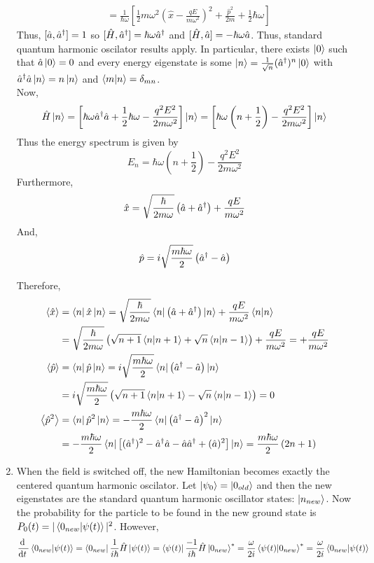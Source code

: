 \documentclass[12pt]{extarticle}
\begin{document}
\begin{enumerate}
\begin{align*}
& =  \frac{1}{\hbar \omega} \left[ \frac{1}{2} m \omega^2 \left(\hat{x} - \frac{qE}{m \omega^2} \right)^2 + \frac{\hat{p}^2}{2 m} + \frac{1}{2} \hbar \omega \right]
\end{align*}
Thus, $[\hat{a}, \hat{a}^\dagger] = 1$ so $[\hat{H}, \hat{a}^\dagger] = \hbar \omega \hat{a}^\dagger$ and $[\hat{H}, \hat{a}] = - \hbar \omega \hat{a}$. Thus, standard quantum harmonic oscilator results apply. In particular, there exists $\left| 0 \right>$ such that $\hat{a} \left| 0 \right> = 0$ and every energy eigenstate is some $\left| n \right> = \frac{1}{\sqrt{n}} (\hat{a}^\dagger)^n \left| 0 \right>$ with $\hat{a}^\dagger \hat{a} \left| n \right> = n \left| n \right>$ and $\left< m | n \right> = \delta_{mn}$. \\

Now, \[\hat{H} \left| n \right> = \left[ \hbar \omega \hat{a}^\dagger \hat{a} + \frac{1}{2} \hbar \omega - \frac{q^2E^2}{2m \omega^2} \right] \left| n \right> = \left[ \hbar \omega \left(n + \frac{1}{2}\right) - \frac{q^2E^2}{2 m \omega^2}  \right] \left| n \right> \]
Thus the energy spectrum is given by
\[E_n = \hbar \omega \left(n + \frac{1}{2}\right) - \frac{q^2E^2}{2m \omega^2} \]
Furthermore, \[\hat{x} = \sqrt{\frac{\hbar}{2 m \omega}} \left( \hat{a} + \hat{a}^\dagger \right) + \frac{qE}{m \omega^2} \]
And, \[\hat{p} = i \sqrt{\frac{m \hbar \omega}{2}} \left( \hat{a}^\dagger - \hat{a} \right)\]

Therefore, 
\begin{align*}
\left< \hat{x} \right> &= \left< n \right| \hat{x} \left| n \right> = \sqrt{\frac{\hbar}{2 m \omega}} \left< n \right| \left( \hat{a} + \hat{a}^\dagger \right) \left| n \right>  + \frac{qE}{m \omega^2} \left< n | n \right> \\ &= \sqrt{\frac{\hbar}{2 m \omega}} \left( \sqrt{n+1} \left< n | n+1 \right> + \sqrt{n} \left< n | n-1 \right> \right) + \frac{qE}{m \omega^2} = + \frac{qE}{m \omega^2} \\
\left< \hat{p} \right> &= \left< n \right| \hat{p} \left| n \right> = i \sqrt{\frac{m \hbar \omega}{2}} \left< n \right| \left( \hat{a}^\dagger - \hat{a} \right) \left| n \right> \\ &= i \sqrt{\frac{m \hbar \omega}{2}} \left( \sqrt{n+1} \left< n | n+1 \right> - \sqrt{n} \left< n | n-1 \right> \right) = 0 \\
\left< \hat{p}^2 \right> &= \left< n \right| \hat{p}^2 \left| n \right> = - \frac{m \hbar \omega}{2} \left< n \right| \left( \hat{a}^\dagger - \hat{a} \right)^2 \left| n \right> \\ &= - \frac{m \hbar \omega}{2} \left< n \right| \left[ (\hat{a}^\dagger)^2 -\hat{a}^\dagger \hat{a} - \hat{a} \hat{a}^\dagger + (\hat{a})^2 \right] \left| n \right> = \frac{m \hbar \omega}{2} \left(2n + 1 \right)
\end{align*}

\item When the field is switched off, the new Hamiltonian becomes exactly the centered quantum harmonic oscilator. Let $\left| \psi_0 \right> = \left| 0_{old} \right>$ and then the new eigenstates are the standard quantum harmonic oscillator states: $\left| n_{new} \right>$. Now the probability for the particle to be found in the new ground state is $P_0(t) = |\left< 0_{new} | \psi(t) \right>|^2$. However, \[\frac{\mathrm{d} \:}{\mathrm{d}t \:} \left< 0_{new} | \psi(t) \right> = \left< 0_{new} \right| \frac{1}{i \hbar} \hat{H} \left| \psi(t) \right> = \left< \psi(t) \right| \frac{-1}{i \hbar} \hat{H} \left| 0_{new} \right>^* = \frac{\omega}{2i} \left< \psi(t) | 0_{new} \right>^* = \frac{\omega}{2i} \left< 0_{new} | \psi(t) \right> \]


\end{enumerate}
\end{document}
